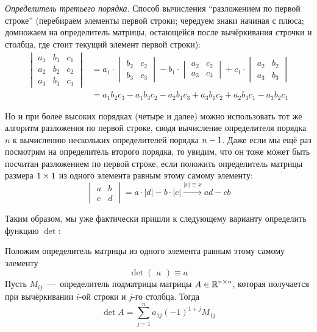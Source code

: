 \documentclass[a4paper,12pt]{article}
\theoremstyle{remark}
\begin{document}
  \emph{Определитель третьего порядка}.
  Способ вычисления ``разложением по первой строке'' (перебираем элементы первой строки; чередуем знаки начиная с плюса; домножаем на определитель матрицы, остающейся после вычёркивания строчки и столбца, где стоит текущий элемент первой строки):
  \begin{equation}
  \label{eq:third-order-det-fy-first-line}
  \begin{split}
    \begin{vmatrix}
      a_1 & b_1 & c_1\\
      a_2 & b_2 & c_2\\
      a_3 & b_3 & c_3
    \end{vmatrix} &=
      a_1 \cdot \begin{vmatrix}b_2 & c_2\\b_3 & c_3\end{vmatrix}
      - b_1 \cdot \begin{vmatrix}a_2 & c_2\\a_3 & c_3\end{vmatrix}
      + c_1 \cdot \begin{vmatrix}a_2 & b_2\\a_3 & b_3\end{vmatrix}\\
      &=a_1 b_2 c_3 - a_1 b_3 c_2 - a_2 b_1 c_3 + a_3 b_1 c_2 + a_2 b_3 c_1 - a_3 b_2 c_1
  \end{split}
  \end{equation}
  
  Но и при более высоких порядках (четыре и далее) можно использовать тот же алгоритм разложения по первой строке, сводя вычисление определителя порядка $n$ к вычислению нескольких определителей порядка $n \hm- 1$.
  Даже если мы ещё раз посмотрим на определитель второго порядка, то увидим, что он тоже может быть посчитан разложением по первой строке, если положить определитель матрицы размера $1 \hm\times 1$ из одного элемента равным этому самому элементу:
  \[
    \begin{vmatrix}
      a & b\\
      c & d
    \end{vmatrix}
    = a \cdot |d| - b \cdot |c|
    \xrightarrow{|x| \equiv x} ad - cb
  \]
  
  Таким образом, мы уже фактически пришли к следующему варианту определить функцию $\det$:
  
  \begin{definition}
    Положим определитель матрицы из одного элемента равным этому самому элементу
    \[
      \det \begin{pmatrix}a\end{pmatrix} \equiv a
    \]
    Пусть $M_{ij}$~---~определитель подматрицы матрицы $A \in \operatorname{\mathbb R}^{n \times n}$, которая получается при вычёркивании $i$-ой строки и $j$-го столбца.
    Тогда
    \begin{equation}\label{eq:recursive-det}
      \det A = \sum\limits_{j = 1}^n a_{1j} (-1)^{1 + j} M_{1j}
    \end{equation}
  \end{definition}
  
\end{document}
